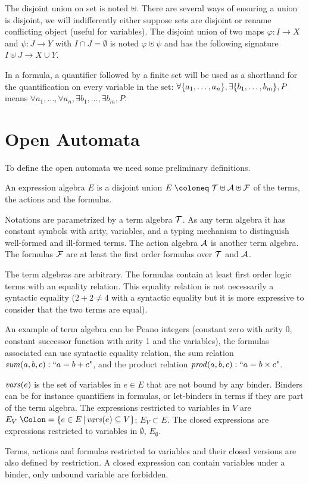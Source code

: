 \documentclass{article}
\begin{document}
The disjoint union on set is noted \(\uplus\).
There are several ways of ensuring a union is disjoint, we will indifferently either suppose sets are disjoint or rename conflicting object (useful for variables).
The disjoint union of two maps \(\varphi: I \to X\) and \(\psi: J \to Y\) with \(I \cap J = \emptyset\) is noted \(\varphi \uplus \psi\) and has the following signature \(I \uplus J \to X \cup Y\).

In a formula, a quantifier followed by a finite set will be used as a shorthand for the quantification on every variable in the set:
\(\forall {\left\{a_1, \dots, a_n\right\}}, \exists {\left\{b_1, \dots, b_m\right\}}, P\) means \(\forall a_1, \dots, \forall a_n, \exists b_1, \dots, \exists b_m, P\).


\section{Open Automata}\label{sec:def}
To define the open automata we need some preliminary definitions.
\begin{defi}
An expression algebra \(E\) is a disjoint union \(E \defobject \terms \uplus \actions \uplus \formulas\) of the terms, the actions and the formulas.

Notations are parametrized by a term algebra \({\mathcal{T}}\).
As any term algebra it has constant symbols with arity, variables, and a typing mechanism to distinguish well-formed and ill-formed terms.
The action algebra \(\mathcal{A}\) is another term algebra.
The formulas \({\mathcal{F}}\) are at least the first order formulas over \({\mathcal{T}}\) and \(\mathcal{A}\).
\end{defi}
The term algebras are arbitrary.
The formulas contain at least first order logic terms with an equality relation.
This equality relation is not necessarily a syntactic equality (\(2 + 2 \neq 4\) with a syntactic equality but it is more expressive to consider that the two terms are equal).

An example of term algebra can be Peano integers (constant zero with arity 0, constant successor function with arity 1 and the variables), the formulas associated can use syntactic equality relation, the sum relation \(\mathit{sum}{\left(a, b, c\right)}: \text{``}a = b + c\text{"}\), and the product relation \(\mathit{prod}{\left(a, b, c\right)}: \text{``}a = b \times c\text{"}\).
\begin{defi}
 \(\mathit{vars}{\left(e\right)}\) is the set of variables in \(e \in E\) that are not bound by any binder.
	Binders can be for instance quantifiers in formulas, or let-binders in terms if they are part of the term algebra.
 The expressions restricted to variables in \(V\) are \(E_V \defnotation \mset{e \in E}{\fvars{e} \subseteq V}\); \(E_V \subset E\).
 The closed expressions are expressions restricted to variables in \(\emptyset\), \(E_\emptyset\).
\end{defi}
Terms, actions and formulas restricted to variables and their closed versions are also defined by restriction.
A closed expression can contain variables under a binder, only unbound variable are forbidden.
\end{document}

